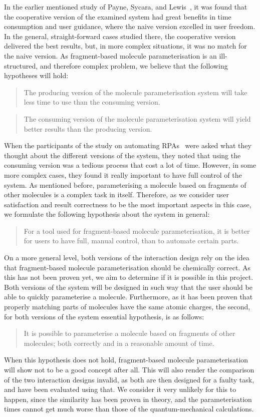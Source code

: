 In the earlier mentioned study of Payne, Sycara, and Lewis~\cite{payne2000varying}, it was found that the cooperative version of the examined system had great benefits in time consumption and user guidance, where the naive version excelled in user freedom. In the general, straight-forward cases studied there, the cooperative version delivered the best results, but, in more complex situations, it was no match for the naive version. As fragment-based molecule parameterisation is an ill-structured, and therefore complex problem, we believe that the following hypotheses will hold:
\begin{quote}
The producing version of the molecule parameterisation system will take less time to use than the consuming version.
\end{quote}
\begin{quote}
The consuming version of the molecule parameterisation system will yield better results than the producing version.
\end{quote}

When the participants of the study on automating RPAs~\cite{payne2000varying} were asked what they thought about the different versions of the system, they noted that using the consuming version was a tedious process that cost a lot of time. However, in some more complex cases, they found it really important to have full control of the system. As mentioned before, parameterising a molecule based on fragments of other molecules is a complex task in itself. Therefore, as we consider user satisfaction and result correctness to be the most important aspects in this case, we formulate the following hypothesis about the system in general:
\begin{quote}
For a tool used for fragment-based molecule parameterisation, it is better for users to have full, manual control, than to automate certain parts.
\end{quote}

On a more general level, both versions of the interaction design rely on the idea that fragment-based molecule parameterisation should be chemically correct. As this has not been proven yet, we aim to determine if it is possible in this project. Both versions of the system will be designed in such way that the user should be able to quickly parameterise a molecule. Furthermore, as it has been proven that properly matching parts of molecules have the same atomic charges, the second, for both versions of the system essential hypothesis, is as follows:
\begin{quote}
It is possible to parameterise a molecule based on fragments of other molecules; both correctly and in a reasonable amount of time.
\end{quote}

When this hypothesis does not hold, fragment-based molecule parameterisation will show not to be a good concept after all. This will also render the comparison of the two interaction designs invalid, as both are then designed for a faulty task, and have been evaluated using that. We consider it very unlikely for this to happen, since the similarity has been proven in theory, and the parameterisation times cannot get much worse than those of the quantum-mechanical calculations.

